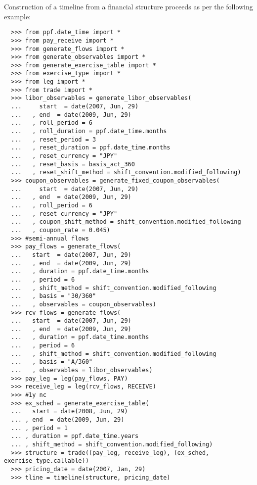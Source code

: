 Construction of a timeline from a financial structure proceeds as per
the following example:
\begin{verbatim}
  >>> from ppf.date_time import *
  >>> from pay_receive import *
  >>> from generate_flows import *
  >>> from generate_observables import *
  >>> from generate_exercise_table import *
  >>> from exercise_type import *
  >>> from leg import *
  >>> from trade import *
  >>> libor_observables = generate_libor_observables(
  ...     start  = date(2007, Jun, 29)
  ...   , end  = date(2009, Jun, 29)
  ...   , roll_period = 6
  ...   , roll_duration = ppf.date_time.months
  ...   , reset_period = 3
  ...   , reset_duration = ppf.date_time.months
  ...   , reset_currency = "JPY"
  ...   , reset_basis = basis_act_360
  ...   , reset_shift_method = shift_convention.modified_following)
  >>> coupon_observables = generate_fixed_coupon_observables(
  ...     start  = date(2007, Jun, 29)
  ...   , end  = date(2009, Jun, 29)
  ...   , roll_period = 6
  ...   , reset_currency = "JPY"
  ...   , coupon_shift_method = shift_convention.modified_following
  ...   , coupon_rate = 0.045)
  >>> #semi-annual flows
  >>> pay_flows = generate_flows(
  ...   start  = date(2007, Jun, 29)
  ...   , end  = date(2009, Jun, 29)
  ...   , duration = ppf.date_time.months
  ...   , period = 6
  ...   , shift_method = shift_convention.modified_following
  ...   , basis = "30/360"
  ...   , observables = coupon_observables)
  >>> rcv_flows = generate_flows(
  ...   start  = date(2007, Jun, 29)
  ...   , end  = date(2009, Jun, 29)
  ...   , duration = ppf.date_time.months
  ...   , period = 6
  ...   , shift_method = shift_convention.modified_following
  ...   , basis = "A/360"
  ...   , observables = libor_observables)
  >>> pay_leg = leg(pay_flows, PAY)
  >>> receive_leg = leg(rcv_flows, RECEIVE)
  >>> #1y nc
  >>> ex_sched = generate_exercise_table(
  ...   start = date(2008, Jun, 29)
  ... , end  = date(2009, Jun, 29)
  ... , period = 1
  ... , duration = ppf.date_time.years
  ... , shift_method = shift_convention.modified_following)
  >>> structure = trade((pay_leg, receive_leg), (ex_sched, exercise_type.callable))
  >>> pricing_date = date(2007, Jan, 29)
  >>> tline = timeline(structure, pricing_date)
\end{verbatim}

